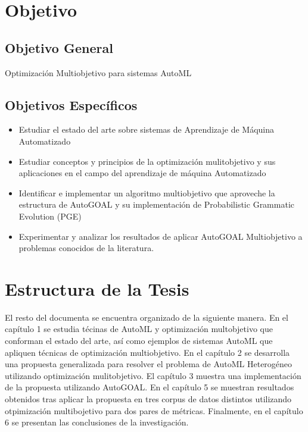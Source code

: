  
\section*{Objetivo}
\subsection*{Objetivo General}
Optimizaci\'on Multiobjetivo para sistemas AutoML
\subsection*{Objetivos Espec\'ificos}
\begin{itemize}
    \item Estudiar el estado del arte sobre sistemas de Aprendizaje de M\'aquina Automatizado
    \item Estudiar conceptos y principios de la optimizaci\'on mulitobjetivo y sus aplicaciones en el campo del aprendizaje de m\'aquina Automatizado
    \item Identificar e implementar un algoritmo multiobjetivo que aproveche la estructura de AutoGOAL y su implementaci\'on de Probabilistic Grammatic Evolution (PGE)
    \item Experimentar y analizar los resultados de aplicar AutoGOAL Multiobjetivo a problemas conocidos de la literatura.
\end{itemize}

\section*{Estructura de la Tesis}
El resto del documenta se encuentra organizado de la siguiente manera. En el cap\'itulo 1 se estudia t\'ecinas de AutoML y optimizaci\'on multobjetivo que conforman el estado del arte, as\'i como ejemplos de sistemas AutoML que apliquen t\'ecnicas de optimizaci\'on multiobjetivo. En el cap\'itulo 2 se desarrolla una propuesta generalizada para resolver el problema de AutoML Heterog\'eneo utilizando optimizaci\'on mulitobjetivo. El cap\'itulo 3 muestra una implementaci\'on de la propuesta utilizando AutoGOAL. En el cap\'itulo 5 se muestran resultados obtenidos tras aplicar la propuesta en tres corpus de datos distintos utilizando otpimizaci\'on multibojetivo para dos pares de m\'etricas. Finalmente, en el cap\'itulo 6 se presentan las conclusiones de la investigaci\'on.
